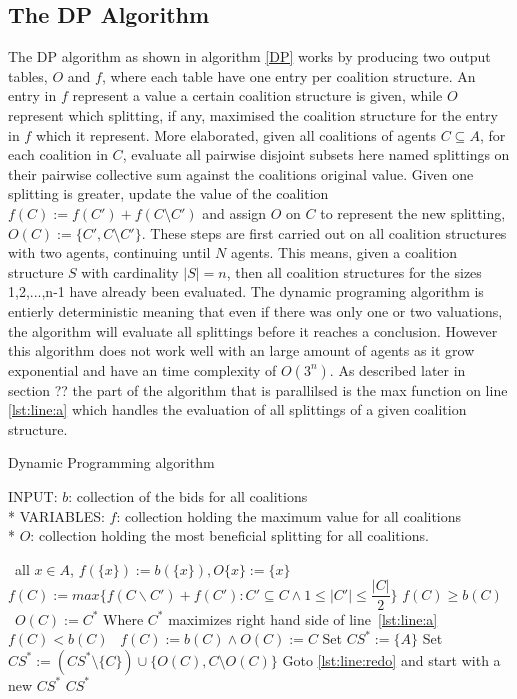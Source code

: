 \documentclass{aamas2012}
\begin{document}
\subsection{The {\secit DP} Algorithm} %


The DP algorithm as shown in algorithm \ref{DP} works by producing two output tables, $O$ and $f$, 
where each table have one entry per coalition structure. 
An entry in $f$ represent a value a certain coalition structure is given, 
while $O$ represent which splitting, if any, maximised the coalition structure for the entry in $f$ which it represent.
More elaborated, given all coalitions of agents $C\subseteq A$, for each coalition in $C$, evaluate all
pairwise disjoint subsets here named splittings on their pairwise collective sum against the coalitions
original value. Given one splitting is greater, update the value of the coalition $f(C) := f(C') + f(C\setminus C')$
and assign $O$ on $C$ to represent the new splitting, $O(C) := \{C',C\setminus C'\}$. These steps are first carried out
on all coalition structures with two agents, continuing until $N$ agents. 
This means, given a coalition structure $S$ with cardinality $|S| = n$, then all coalition structures
for the sizes 1,2,...,n-1 have already been evaluated. The dynamic programing algorithm is entierly deterministic meaning
that even if there was only one or two valuations, the algorithm will evaluate all splittings before it reaches a conclusion.
However this algorithm does not work well with an large amount of agents as it grow exponential and have an time complexity of $O(3^n)$.
As described later in section ?? the part of the algorithm that is parallilsed is the max function on line \ref{lst:line:a}
which handles the evaluation of all splittings of a given coalition structure.

\begin{algorithm}
\caption{Dynamic Programming algorithm \label{DP}}
INPUT: $b$: collection of the bids for all coalitions\\*
VARIABLES: $f$: collection holding the maximum value for all coalitions\\*
$O$: collection holding the most beneficial splitting for all coalitions.
\begin{algorithmic}[1]
\STATE\algorithmicfor\ all $x \in A$, \algorithmicdo  $f(\{x\}):= b(\{x\}),O\{x\}:= \{x\}$ \algorithmicendfor
{}
\STATE $f(C) := max\{f(C\backslash C')+f(C'):C'\subseteq C \wedge 1 \leq \vert C' \vert \leq \dfrac{\vert C \vert}{2}\}$ \label{lst:line:a}
\STATE\algorithmicif $f(C) \geq b(C)$ \algorithmicthen\ $O(C) := C^{*}$ \hfill Where $C^{*}$ maximizes right hand side of line~\ref{lst:line:a} \algorithmicendif
\STATE\algorithmicif $f(C) < b(C)$ \algorithmicthen\ $f(C) := b(C)\wedge O(C) := C$ \algorithmicendif
\ENDFOR
\ENDFOR
\STATE Set $CS^* := \{A\}$
 \label{lst:line:redo}
\STATE Set $CS^* := (CS^*\setminus \{C\})\cup \{O(C),C\setminus O(C)\}$ 
\STATE Goto \ref{lst:line:redo} and start with a new $CS^*$
\ENDIF
\ENDFOR
\RETURN $CS^*$
\end{algorithmic}
\end{algorithm}
\end{document}
